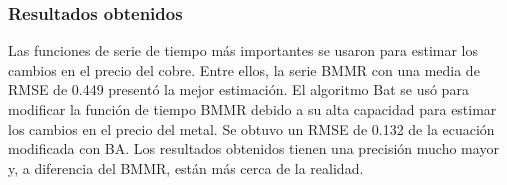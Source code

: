 \subsubsection{Resultados obtenidos}
Las funciones de serie de tiempo más importantes se usaron para estimar los cambios en el precio del cobre. Entre ellos, la serie BMMR con una media de RMSE de 0.449 presentó la mejor estimación. El algoritmo Bat  se usó para modificar la función de tiempo BMMR debido a su alta capacidad para estimar los cambios en el precio del metal. Se obtuvo un RMSE de 0.132 de la ecuación modificada con BA. Los resultados obtenidos tienen una precisión mucho mayor y, a diferencia del BMMR, están más cerca de la realidad.

 